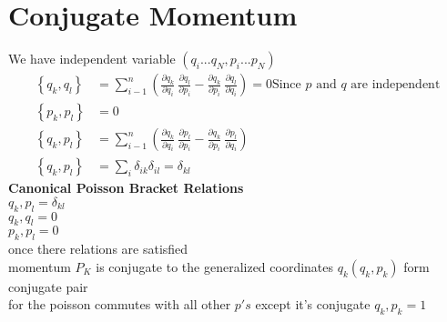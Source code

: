 \section{Conjugate Momentum}
We have independent variable $(q_i...q_N,p_i...p_N)$
\begin{align*}
\left\lbrace q_k,q_l\right\rbrace &=\sum\limits_{i-1}^{n}\left(\frac{\partial q_k}{\partial q_i}\ \frac{\partial q_l}{\partial p_i}-\frac{\partial q_k}{\partial p_i}\ \frac{\partial q_l}{\partial q_i}\right)=0 \text{Since $p$ and $q$ are independent}\\
\left\lbrace p_k,p_l\right\rbrace  &=0  \\
\left\lbrace q_k,p_l\right\rbrace  &=\sum\limits_{i-1}^{n}\left(\frac{\partial q_k}{\partial q_i}\ \frac{\partial p_l}{\partial p_i}-\frac{\partial q_k}{\partial p_i}\ \frac{\partial p_l}{\partial q_i}\right)\\
\left\lbrace q_k,p_l\right\rbrace  &=\sum\limits_{i}\delta_{ik}\delta_{il}=\delta_{kl}
\end{align*}
\textbf{Canonical Poisson Bracket Relations}\\
${q_k,p_l}=\delta_{kl}$\\
${q_k,q_l}=0$\\
${p_k,p_l}=0$\\
once there relations are satisfied\\
momentum $P_K$ is conjugate to the generalized coordinates $q_k (q_k,p_k)$ form conjugate pair\\
for the poisson commutes with all other $p's$ except it's conjugate ${q_k,p_k}=1$






